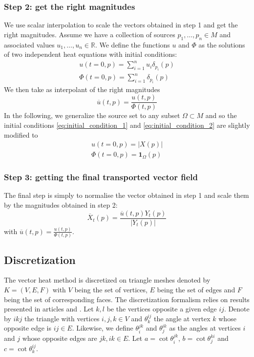 \documentclass[sigconf, nonacm]{acmart}
\begin{document}
\subsubsection{Step 2: get the right magnitudes}
We use scalar interpolation to scale the vectors obtained in step 1 and get the right magnitudes. Assume we have a collection of sources
$p_1, \dots, p_n \in M$ and associated values $u_1, \dots, u_n \in \mathbb{R}$. We define the functions $u$ and $\Phi$ 
as the solutions of two independent heat equations with initial conditions:
\begin{align}
  u(t = 0, p) = \sum_{i = 1}^nu_i\delta_{p_i}(p) \label{eq:initial_condition_1}\\
  \Phi(t = 0, p) = \sum_{i=1}^n\delta_{p_i}(p) \label{eq:initial_condition_2}
\end{align}
We then take as interpolant of the right magnitudes 
\begin{equation}
  \overline{u}(t,p) = \frac{u(t,p)}{\Phi(t,p)}
\end{equation}
In the following, we generalize the source set to any subset $\Omega \subset M$
and so the initial conditions \ref{eq:initial_condition_1} and \ref{eq:initial_condition_2}
are slightly modified to 
\begin{align*}
  u(t=0, p) = | X(p) | \\
  \Phi(t=0, p) = \mathbf{1}_{\Omega}(p)
\end{align*}

\subsubsection{Step 3: getting the final transported vector field}
The final step is simply to normalise the vector obtained in step 1 and scale them by the magnitudes obtained in step 2: 
$$\overline{X}_t(p) = \frac{\overline{u}(t,p)Y_t(p)}{|Y_t(p)|}$$ with $\overline{u}(t,p) = \frac{u(t,p)}{\Phi(t, p)}$.

\subsection{Discretization}
The vector heat method is discretized on triangle meshes denoted by $K = (V, E, F)$
with $V$ being the set of vertices, $E$ being the set of edges and $F$ 
being the set of corresponding faces. The discretization formalism relies 
on results presented in articles \cite{10.1145/2461912.2462005} and \cite{Knoppel:2015:SPS}. Let $k,l$ be the vertices opposite 
a given edge $ij$. Denote by $ikj$ the triangle with vertices $i, j, k \in V$ and $\theta_k^{ij}$ the angle at 
vertex $k$ whose opposite edge is $ij\in E$. Likewise, we define $\theta_i^{jk}$ 
and $\theta_j^{ik}$ as the angles at vertices $i$ and $j$ whose opposite edges are $jk, ik \in E$. 
Let $a = \cot \theta_i^{jk}$, $b = \cot \theta_j^{ki}$ and $c = \cot \theta_k^{ij}$. 
\end{document}
